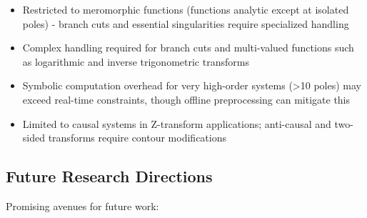 \documentclass[conference]{IEEEtran}
\begin{document}
\begin{itemize}
    \item Restricted to meromorphic functions (functions analytic except at isolated poles) - branch cuts and essential singularities require specialized handling
    \item Complex handling required for branch cuts and multi-valued functions such as logarithmic and inverse trigonometric transforms
    \item Symbolic computation overhead for very high-order systems (>10 poles) may exceed real-time constraints, though offline preprocessing can mitigate this
    \item Limited to causal systems in Z-transform applications; anti-causal and two-sided transforms require contour modifications
\end{itemize}

\subsection{Future Research Directions}

Promising avenues for future work:
\end{document}
